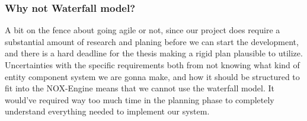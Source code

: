 \subsubsection*{Why not Waterfall model?}

A bit on the fence about going agile or not, since our project does require a substantial amount of research and planing before we can start the development, and there is a hard deadline for the thesis making a rigid plan plausible to utilize. 
Uncertainties with the specific requirements both from not knowing what kind of entity component system we are gonna make, and how it should be structured to fit into the NOX-Engine means that we cannot use the waterfall model.
It would've required way too much time in the planning phase to completely understand everything needed to implement our system.